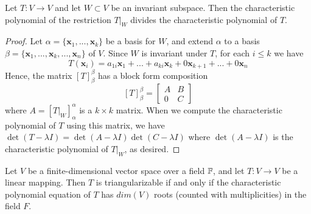 \documentclass[12pt, a4paper, oneside, openright, titlepage]{book}
\newcommand{\mb}[1]{\mathbf{#1}}
\begin{document}
\begin{prop}
    Let $T:V\rightarrow V$ and let $W \subset V$ be an invariant subspace. Then the characteristic polynomial of the restriction $T\rvert_W$ divides the characteristic polynomial of $T$.
\end{prop}

\begin{proof}
    Let $\alpha = \{\mb x_1,...,\mb x_k\}$ be a basis for $W$, and extend $\alpha$ to a basis $\beta = \{\mb x_1,...,\mb x_k,...,\mb x_n\}$ of $V$. Since $W$ is invariant under $T$, for each $i \leq k$ we have $$T(\mb x_i) = a_{1i}\mb x_1 + ... + a_{ki}\mb x_k + 0\mb x_{k+1} + ... + 0 \mb x_n$$
    Hence, the matrix $[T]_{\beta}^{\beta}$ has a block form composition $$[T]_{\beta}^{\beta} = \begin{bmatrix} A & B \\ 0 & C \end{bmatrix}$$
    where $A = [T\rvert_W]_{\alpha}^{\alpha}$ is a $k \times k$ matrix. When we compute the characteristic polynomial of $T$ using this matrix, we have $\det(T - \lambda I) = \det(A - \lambda I)\det(C - \lambda I)$ where $\det(A - \lambda I)$ is the characteristic polynomial of $T\rvert_W$, as desired.
\end{proof}


\begin{thm}
    Let $V$ be a finite-dimensional vector space over a field $\mathbb F$, and let $T:V\rightarrow V$ be a linear mapping. Then $T$ is triangularizable if and only if the characteristic polynomial equation of $T$ has $dim(V)$ roots (counted with multiplicities) in the field $F$.
\end{thm}
\end{document}
